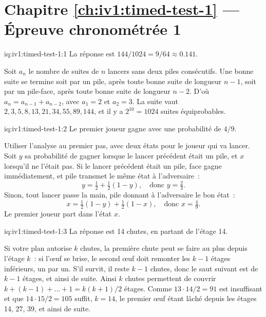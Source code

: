 \section*{Chapitre \ref{ch:iv1:timed-test-1} --- Épreuve chronométrée 1}

\begin{solution}{iq:iv1:timed-test-1:1}
La réponse est $144/1024 = 9/64 \approx 0.141$.

Soit $a_n$ le nombre de suites de $n$ lancers sans deux piles consécutifs. Une bonne suite se termine soit par un pile, après toute bonne suite de longueur $n - 1$, soit par un pile-face, après toute bonne suite de longueur $n - 2$. D'où $a_n = a_{n-1} + a_{n-2}$, avec $a_1 = 2$ et $a_2 = 3$. La suite vaut $2, 3, 5, 8, 13, 21, 34, 55, 89, 144$, et il y a $2^{10} = 1024$ suites équiprobables.

\end{solution}

\begin{solution}{iq:iv1:timed-test-1:2}
Le premier joueur gagne avec une probabilité de $4/9$.

Utiliser l'analyse au premier pas, avec deux états pour le joueur qui va lancer. Soit $y$ sa probabilité de gagner lorsque le lancer précédent était un pile, et $x$ lorsqu'il ne l'était pas. Si le lancer précédent était un pile, face gagne immédiatement, et pile transmet le même état à l'adversaire~:
\[
y = \tfrac12 + \tfrac12(1 - y), \quad\text{donc } y = \tfrac23.
\]
Sinon, tout lancer passe la main, pile donnant à l'adversaire le bon état~:
\[
x = \tfrac12(1 - y) + \tfrac12(1 - x), \quad\text{donc } x = \tfrac49.
\]
Le premier joueur part dans l'état $x$.

\end{solution}

\begin{solution}{iq:iv1:timed-test-1:3}
La réponse est 14 chutes, en partant de l'étage 14.

Si votre plan autorise $k$ chutes, la première chute peut se faire au plus depuis l'étage $k$~: si l'œuf se brise, le second œuf doit remonter les $k - 1$ étages inférieurs, un par un. S'il survit, il reste $k - 1$ chutes, donc le saut suivant est de $k - 1$ étages, et ainsi de suite. Ainsi $k$ chutes permettent de couvrir $k + (k - 1) + \dots + 1 = k(k + 1)/2$ étages. Comme $13 \cdot 14/2 = 91$ est insuffisant et que $14 \cdot 15/2 = 105$ suffit, $k = 14$, le premier œuf étant lâché depuis les étages 14, 27, 39, et ainsi de suite.

\end{solution}

